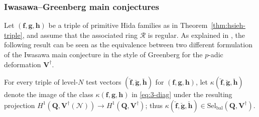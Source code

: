 \documentclass[10pt,letterpaper]{amsart}
\theoremstyle{plain}
\theoremstyle{definition}
\theoremstyle{definition}
\theoremstyle{plain}
\theoremstyle{plain}
\theoremstyle{plain}
\theoremstyle{remark}
\numberwithin{equation}{section}
\newcommand{\Sel}{Sel}
\newcommand{\rH}{H}
\newcommand{\ppbar}{\bar{\mathfrak{p}}}
\DeclareMathOperator{\bal}{\mathrm{bal}}
\newcommand{\Vdag}{{\mathbf{V}^\dagger}}
\newcommand{\Adag}{{\mathbf{A}^\dagger}}
\newcommand{\unb}{{\boldsymbol{f}}}
\newcommand{\Q}{\mathbf{Q}}
\def\Sel{{\rm Sel}}
\newcommand{\bff}{{\boldsymbol{f}}}
\newcommand{\bfg}{{\boldsymbol{g}}}
\newcommand{\bfh}{{\boldsymbol{h}}}
\begin{document}
%

\subsubsection{Iwasawa--Greenberg main conjectures}
\label{subsec:IMC}

Let $(\bff,\bfg,\bfh)$ be a triple of primitive Hida families as in Theorem~\ref{thm:hsieh-triple}, and assume that the associated ring $\mathcal{R}$ is  regular. As explained in \cite[\S{7.3}]{ACR}, the following result can be seen as the equivalence between two different formulation of the Iwasawa main conjecture in the style of Greenberg \cite{Greenberg55} for the $p$-adic deformation $\Vdag$. 


For every triple of level-$N$ test vectors $(\breve{\bff},\breve{\bfg},\breve{\bfh})$ for $(\bff,\bfg,\bfh)$, let $\kappa(\breve{\bff},\breve{\bfg},\breve{\bfh})$ denote the image of the class $\kappa({\bff},{\bfg},{\bfh})$ in \eqref{eq:3-diag} under the resulting projection $\rH^1(\Q,\Vdag(\mathscr{N}))\rightarrow\rH^1(\Q,\Vdag)$; thus $\kappa(\breve{\bff},\breve{\bfg},\breve{\bfh})\in{\mathrm{Sel}}_{\bal}(\Q,\Vdag)$.
\end{document}
